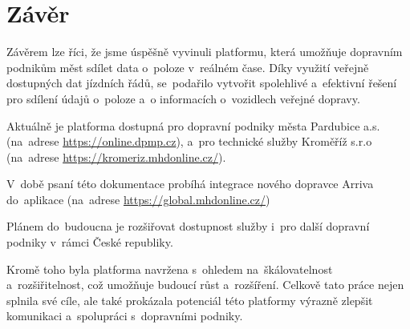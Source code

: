 \chapter{Závěr}
Závěrem lze říci, že jsme úspěšně vyvinuli platformu, která umožňuje dopravním podnikům měst sdílet data o~poloze v~reálném čase. Díky využití veřejně dostupných dat jízdních řádů, se~podařilo vytvořit spolehlivé a~efektivní řešení pro sdílení údajů o~poloze a~o informacích o~vozidlech veřejné dopravy.\par
Aktuálně je platforma dostupná pro dopravní podniky města Pardubice a.s. (na~adrese \href{https://online.dpmp.cz}{https://online.dpmp.cz}), a~pro technické služby Kroměříž s.r.o \\ (na~adrese \href{https://kromeriz.mhdonline.cz/}{https://kromeriz.mhdonline.cz/}).

V~době psaní této dokumentace probíhá integrace nového dopravce Arriva do~aplikace (na~adrese \href{https://global.mhdonline.cz/}{https://global.mhdonline.cz/})

Plánem do~budoucna je rozšiřovat dostupnost služby i~pro další dopravní podniky v~rámci České republiky.\par
Kromě toho byla platforma navržena s~ohledem na~škálovatelnost a~rozšiřitelnost, což umožňuje budoucí růst a~rozšíření. Celkově tato práce nejen splnila své cíle, ale také prokázala potenciál této platformy výrazně zlepšit komunikaci a~spolupráci s~dopravními podniky.
